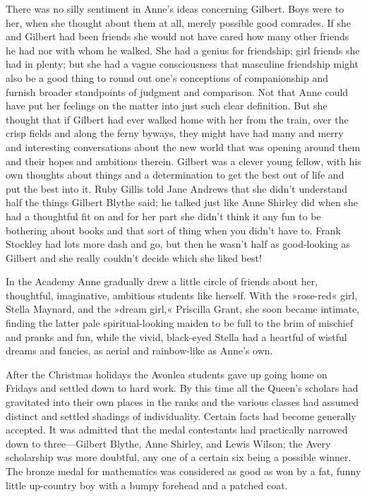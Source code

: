 There was no silly sentiment in Anne's ideas concerning Gilbert. Boys were to her, when she thought about them at all, merely possible good comrades. If she and Gilbert had been friends she would not have cared how many other friends he had nor with whom he walked. She had a genius for friendship; girl friends she had in plenty; but she had a vague consciousness that masculine friendship might also be a good thing to round out one's conceptions of companionship and furnish broader standpoints of judgment and comparison. Not that Anne could have put her feelings on the matter into just such clear definition. But she thought that if Gilbert had ever walked home with her from the train, over the crisp fields and along the ferny byways, they might have had many and merry and interesting conversations about the new world that was opening around them and their hopes and ambitions therein. Gilbert was a clever young fellow, with his own thoughts about things and a determination to get the best out of life and put the best into it. Ruby Gillis told Jane Andrews that she didn't understand half the things Gilbert Blythe said; he talked just like Anne Shirley did when she had a thoughtful fit on and for her part she didn't think it any fun to be bothering about books and that sort of thing when you didn't have to. Frank Stockley had lots more dash and go, but then he wasn't half as good-looking as Gilbert and she really couldn't decide which she liked best!

In the Academy Anne gradually drew a little circle of friends about her, thoughtful, imaginative, ambitious students like herself. With the »rose-red« girl, Stella Maynard, and the »dream girl,« Priscilla Grant, she soon became intimate, finding the latter pale spiritual-looking maiden to be full to the brim of mischief and pranks and fun, while the vivid, black-eyed Stella had a heartful of wistful dreams and fancies, as aerial and rainbow-like as Anne's own.

After the Christmas holidays the Avonlea students gave up going home on Fridays and settled down to hard work. By this time all the Queen's scholars had gravitated into their own places in the ranks and the various classes had assumed distinct and settled shadings of individuality. Certain facts had become generally accepted. It was admitted that the medal contestants had practically narrowed down to three—Gilbert Blythe, Anne Shirley, and Lewis Wilson; the Avery scholarship was more doubtful, any one of a certain six being a possible winner. The bronze medal for mathematics was considered as good as won by a fat, funny little up-country boy with a bumpy forehead and a patched coat.

